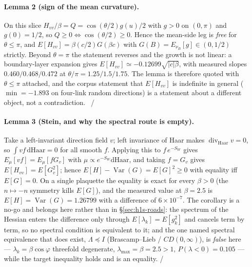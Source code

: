 \paragraph{Lemma 2 (sign of the mean curvature).} On this slice $H_{vv}/\beta=Q=\cos(\theta/2)g(u)/2$
with $g>0$ on $(0,\pi)$ and $g(0)=1/2$, so $Q\ge0\iff\cos(\theta/2)\ge0$. Hence the mean-side leg is
\emph{free} for $\theta\le\pi$, and $E[H_{vv}]=\beta(c/2)G(\beta c)$ with
$G(B)=E_{\nu_{B}}[g]\in(0,1/2)$ strictly. Beyond $\theta=\pi$ the statement reverses and the growth is
not linear: a boundary-layer expansion gives $E[H_{vv}]\simeq-0.12699\sqrt{|c|\beta}$, with measured
slopes $0.460/0.468/0.472$ at $\theta/\pi=1.25/1.5/1.75$. The lemma is therefore quoted with
$\theta\le\pi$ attached, and the corpus statement that $E[H_{vv}]$ is indefinite in general
($\min=-1.893$ on four-link random directions) is a statement about a different object, not a
contradiction. \LT{}~/~\LC


\paragraph{Lemma 3 (Stein, and why the spectral route is empty).} Take a left-invariant direction
field $v$; left invariance of Haar makes $\operatorname{div}_{\mathrm{Haar}}v=0$, so
$\int vf\,\mathrm{d}\mathrm{Haar}=0$ for all smooth $f$. Applying this to $f\,e^{-S_W}$ gives
$E_{\mu}[vf]=E_{\mu}[fG_{v}]$ with $\mu\propto e^{-S_W}\mathrm{d}\mathrm{Haar}$, and taking $f=G_{v}$ gives
$E[H_{vv}]=E[G_{v}^{2}]$; hence $E[H]-\operatorname{Var}(G)=E[G]^{2}\ge0$ with equality iff $E[G]=0$.
On a single plaquette the equality is exact for every $\beta>0$ (the $n\mapsto-n$ symmetry kills
$E[G]$), and the measured value at $\beta=2.5$ is $E[H]=\operatorname{Var}(G)=1.26799$ with a
difference of $6\times10^{-7}$. The corollary is a no-go and belongs here rather than in
\S\ref{sec:h1s-roads}: the spectrum of the Hessian enters the difference only through
$E[\lambda_{k}]=E[g_{k}^{2}]$ and cancels term by term, so no spectral condition is equivalent to it;
and the one named spectral equivalence that does exist, $\Lambda\preceq I$ (Brascamp--Lieb /
$CD(0,\infty)$), is \emph{false} here --- $\lambda_{k}=\beta\cos\varphi$ threefold degenerate,
$\lambda_{\max}=\beta=2.5>1$, $P(\lambda<0)=0.105$ --- while the target inequality holds and is an
equality. \LT{}/~\LN

